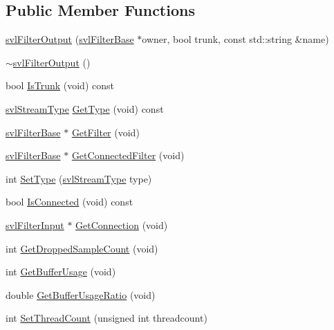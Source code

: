 \subsection*{Public Member Functions}
\begin{DoxyCompactItemize}
\item 
\hyperlink{classsvl_filter_output_a97fb74a94034199e0b7481e92d8c989e}{svl\+Filter\+Output} (\hyperlink{classsvl_filter_base}{svl\+Filter\+Base} $\ast$owner, bool trunk, const std\+::string \&name)
\item 
\hyperlink{classsvl_filter_output_afcc1539960b0109c83403c121fb1d44a}{$\sim$svl\+Filter\+Output} ()
\item 
bool \hyperlink{classsvl_filter_output_aa7f056a54929e4d41a9e9f34e8247318}{Is\+Trunk} (void) const 
\item 
\hyperlink{svl_definitions_8h_aa00696d338a58db361335a01fd11e122}{svl\+Stream\+Type} \hyperlink{classsvl_filter_output_a10b0e55f8d32ff9bb201d69dd4429905}{Get\+Type} (void) const 
\item 
\hyperlink{classsvl_filter_base}{svl\+Filter\+Base} $\ast$ \hyperlink{classsvl_filter_output_ab334ce91aeb67c738e722f260bc30389}{Get\+Filter} (void)
\item 
\hyperlink{classsvl_filter_base}{svl\+Filter\+Base} $\ast$ \hyperlink{classsvl_filter_output_a397b05759383671c2a781506e1d41009}{Get\+Connected\+Filter} (void)
\item 
int \hyperlink{classsvl_filter_output_a371e969cac1e7b7c8fadba8b23534e8b}{Set\+Type} (\hyperlink{svl_definitions_8h_aa00696d338a58db361335a01fd11e122}{svl\+Stream\+Type} type)
\item 
bool \hyperlink{classsvl_filter_output_a72bc74e1bfd1a7304caa864feb837c6e}{Is\+Connected} (void) const 
\item 
\hyperlink{classsvl_filter_input}{svl\+Filter\+Input} $\ast$ \hyperlink{classsvl_filter_output_af6572856fbffd33874a025591b419ef0}{Get\+Connection} (void)
\item 
int \hyperlink{classsvl_filter_output_ac56ede1ebac6ace45de3c456058105c4}{Get\+Dropped\+Sample\+Count} (void)
\item 
int \hyperlink{classsvl_filter_output_acd6f1cfffc6c43644cafde324bae32b6}{Get\+Buffer\+Usage} (void)
\item 
double \hyperlink{classsvl_filter_output_a0e0254ca5edc31adbf5c0aeea73376cd}{Get\+Buffer\+Usage\+Ratio} (void)
\item 
int \hyperlink{classsvl_filter_output_adc9db7b70941dfce280fed63dbdf46cd}{Set\+Thread\+Count} (unsigned int threadcount)

\end{DoxyCompactItemize}
